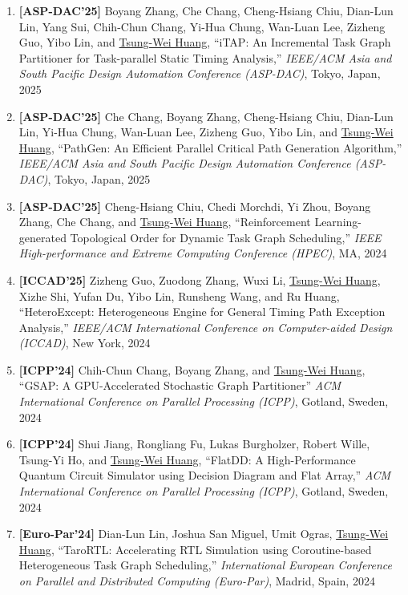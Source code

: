 \documentclass[A4,11pt]{article}
\begin{document}
\begin{enumerate}
    \item \textbf{[ASP-DAC'25]} Boyang Zhang, Che Chang, Cheng-Hsiang Chiu, Dian-Lun Lin, Yang Sui, Chih-Chun Chang, Yi-Hua Chung, Wan-Luan Lee, Zizheng Guo, Yibo Lin, and \underline{Tsung-Wei Huang}, ``iTAP: An Incremental Task Graph Partitioner for Task-parallel Static Timing Analysis,'' \textit{IEEE/ACM Asia and South Pacific Design Automation Conference (ASP-DAC)}, Tokyo, Japan, 2025

    \item \textbf{[ASP-DAC'25]} Che Chang, Boyang Zhang, Cheng-Hsiang Chiu, Dian-Lun Lin, Yi-Hua Chung, Wan-Luan Lee, Zizheng Guo, Yibo Lin, and \underline{Tsung-Wei Huang}, ``PathGen: An Efficient Parallel Critical Path Generation Algorithm,'' \textit{IEEE/ACM Asia and South Pacific Design Automation Conference (ASP-DAC)}, Tokyo, Japan, 2025

    \item \textbf{[ASP-DAC'25]} Cheng-Hsiang Chiu, Chedi Morchdi, Yi Zhou, Boyang Zhang, Che Chang, and \underline{Tsung-Wei Huang}, ``Reinforcement Learning-generated Topological Order for Dynamic Task Graph Scheduling,'' \textit{IEEE High-performance and Extreme Computing Conference (HPEC)}, MA, 2024

    \item \textbf{[ICCAD'25]} Zizheng Guo, Zuodong Zhang, Wuxi Li, \underline{Tsung-Wei Huang}, Xizhe Shi, Yufan Du, Yibo Lin, Runsheng Wang, and Ru Huang, ``HeteroExcept: Heterogeneous Engine for General Timing Path Exception Analysis,'' \textit{IEEE/ACM International Conference on Computer-aided Design (ICCAD)}, New York, 2024 

    \item \textbf{[ICPP'24]} Chih-Chun Chang, Boyang Zhang, and \underline{Tsung-Wei Huang}, ``GSAP: A GPU-Accelerated Stochastic Graph Partitioner'' \textit{ACM International Conference on Parallel Processing (ICPP)}, Gotland, Sweden, 2024

    \item \textbf{[ICPP'24]} Shui Jiang, Rongliang Fu, Lukas Burgholzer, Robert Wille, Tsung-Yi Ho, and \underline{Tsung-Wei Huang}, ``FlatDD: A High-Performance Quantum Circuit Simulator using Decision Diagram and Flat Array,'' \textit{ACM International Conference on Parallel Processing (ICPP)}, Gotland, Sweden, 2024

    \item \textbf{[Euro-Par'24]} Dian-Lun Lin, Joshua San Miguel, Umit Ogras, \underline{Tsung-Wei Huang}, ``TaroRTL: Accelerating RTL Simulation using Coroutine-based Heterogeneous Task Graph Scheduling,'' \textit{International European Conference on Parallel and Distributed Computing (Euro-Par)}, Madrid, Spain, 2024


\end{enumerate}
\end{document}

